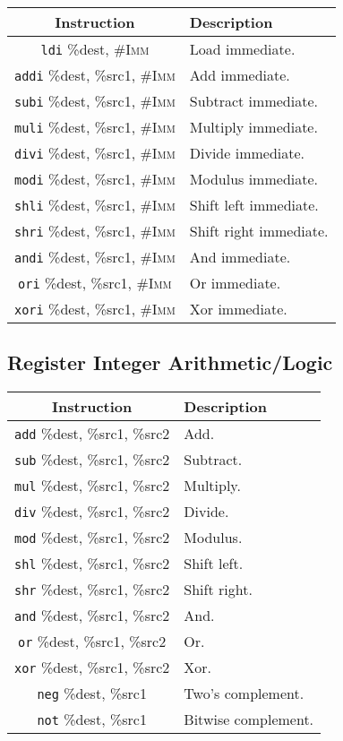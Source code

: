 \documentclass[10pt,letterpaper]{article}
\begin{document}
\begin{center}
\begin{tabular}{cl}
\textbf{Instruction}&\textbf{Description}\\
\hline
\texttt{ldi} \%dest, \textsc{\#Imm}&Load immediate.\\
\texttt{addi} \%dest, \%src1, \textsc{\#Imm}&Add immediate.\\
\texttt{subi} \%dest, \%src1, \textsc{\#Imm}&Subtract immediate.\\
\texttt{muli} \%dest, \%src1, \textsc{\#Imm}&Multiply immediate.\\
\texttt{divi} \%dest, \%src1, \textsc{\#Imm}&Divide immediate.\\
\texttt{modi} \%dest, \%src1, \textsc{\#Imm}&Modulus immediate.\\
\texttt{shli} \%dest, \%src1, \textsc{\#Imm}&Shift left immediate.\\
\texttt{shri} \%dest, \%src1, \textsc{\#Imm}&Shift right immediate.\\
\texttt{andi} \%dest, \%src1, \textsc{\#Imm}&And immediate.\\
\texttt{ori} \%dest, \%src1, \textsc{\#Imm}&Or immediate.\\
\texttt{xori} \%dest, \%src1, \textsc{\#Imm}&Xor immediate.\\
\end{tabular}
\end{center}

\subsection{Register Integer Arithmetic/Logic}
\begin{center}
\begin{tabular}{cl}
\textbf{Instruction}&\textbf{Description}\\
\hline
\texttt{add} \%dest, \%src1, \%src2&Add.\\
\texttt{sub} \%dest, \%src1, \%src2&Subtract.\\
\texttt{mul} \%dest, \%src1, \%src2&Multiply.\\
\texttt{div} \%dest, \%src1, \%src2&Divide.\\
\texttt{mod} \%dest, \%src1, \%src2&Modulus.\\
\texttt{shl} \%dest, \%src1, \%src2&Shift left.\\
\texttt{shr} \%dest, \%src1, \%src2&Shift right.\\
\texttt{and} \%dest, \%src1, \%src2&And.\\
\texttt{or} \%dest, \%src1, \%src2&Or.\\
\texttt{xor} \%dest, \%src1, \%src2&Xor.\\
\texttt{neg} \%dest, \%src1&Two's complement.\\
\texttt{not} \%dest, \%src1&Bitwise complement.\\
\end{tabular}
\end{center}
\end{document}
